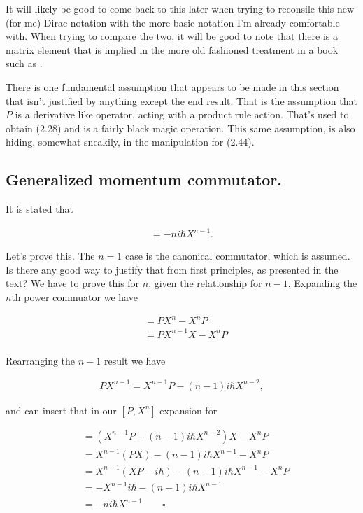 It will likely be good to come back to this later when trying to reconsile this new (for me) Dirac notation with the more basic notation I'm already comfortable with.  When trying to compare the two, it will be good to note that there is a matrix element that is implied in the more old fashioned treatment in a book such as \cite{bohm1989qt}.

There is one fundamental assumption that appears to be made in this section that isn't justified by anything except the end result.  That is the assumption that $P$ is a derivative like operator, acting with a product rule action.  That's used to obtain (2.28) and is a fairly black magic operation.  This same assumption, is also hiding, somewhat sneakily, in the manipulation for (2.44).

\subsection{Generalized momentum commutator.}

It is stated that

\begin{align*}
[P,X^n] = - n i \hbar X^{n-1}.
\end{align*}

Let's prove this.  The $n=1$ case is the canonical commutator, which is assumed.  Is there any good way to justify that from first principles, as presented in the text?  We have to prove this for $n$, given the relationship for $n-1$.  Expanding the $n$th power commuator we have

\begin{align*}
[P,X^n] 
&= P X^n - X^n P \\
&= P X^{n-1} X - X^{n } P \\
\end{align*}

Rearranging the $n-1$ result we have

\begin{align*}
P X^{n-1} = X^{n-1} P - (n-1) i \hbar X^{n-2},
\end{align*}

and can insert that in our $[P,X^n]$ expansion for

\begin{align*}
[P,X^n] 
&= \left( X^{n-1} P - (n-1) i \hbar X^{n-2} \right)X - X^{n } P \\
&= X^{n-1} (PX) - (n-1) i \hbar X^{n-1} - X^{n } P \\
&= X^{n-1} ( X P - i\hbar) - (n-1) i \hbar X^{n-1} - X^{n } P \\
&= -X^{n-1} i\hbar - (n-1) i \hbar X^{n-1} \\
&= -n i \hbar X^{n-1} 
\qquad\square
\end{align*}

